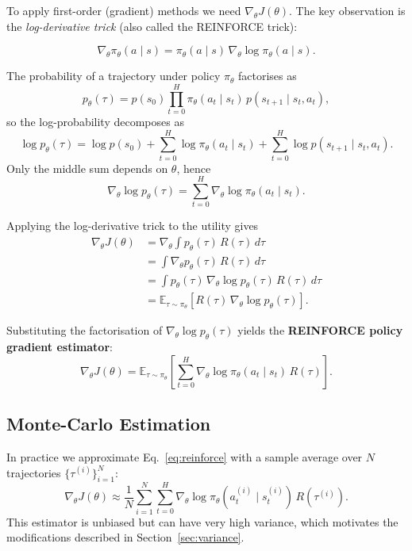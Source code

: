 \documentclass[12pt, a4paper]{article}
\theoremstyle{definition}
\theoremstyle{plain}
\theoremstyle{remark}
\newcommand{\E}{\mathbb{E}}
\newcommand{\traj}{\tau}
\newcommand{\pith}{\pi_\theta}
\newcommand{\Rtraj}{R(\traj)}
\newcommand{\Jth}{J(\theta)}
\newcommand{\grad}{\nabla_\theta}
\begin{document}
To apply first-order (gradient) methods we need $\grad \Jth$.  The key observation is the
\emph{log-derivative trick} (also called the REINFORCE trick):

\begin{equation}
  \grad \pith(a \mid s)
    = \pith(a \mid s)\, \grad \log \pith(a \mid s).
\end{equation}

The probability of a trajectory under policy $\pith$ factorises as
\begin{equation}
  p_\theta(\traj) = p(s_0) \prod_{t=0}^{H} \pith(a_t \mid s_t)\, p(s_{t+1} \mid s_t, a_t),
\end{equation}
so the log-probability decomposes as
\begin{equation}
  \log p_\theta(\traj) = \log p(s_0)
    + \sum_{t=0}^{H} \log \pith(a_t \mid s_t)
    + \sum_{t=0}^{H} \log p(s_{t+1} \mid s_t, a_t).
\end{equation}
Only the middle sum depends on $\theta$, hence
\begin{equation}
  \grad \log p_\theta(\traj) = \sum_{t=0}^{H} \grad \log \pith(a_t \mid s_t).
\end{equation}

Applying the log-derivative trick to the utility gives
\begin{align}
  \grad \Jth
    &= \grad \int p_\theta(\traj)\, \Rtraj\, d\traj \nonumber\\
    &= \int \grad p_\theta(\traj)\, \Rtraj\, d\traj \nonumber\\
    &= \int p_\theta(\traj)\, \grad \log p_\theta(\traj)\, \Rtraj\, d\traj \nonumber\\
    &= \E_{\traj \sim \pith}\!\left[\Rtraj\, \grad \log p_\theta(\traj)\right].
\end{align}

Substituting the factorisation of $\grad \log p_\theta(\traj)$ yields the
\textbf{REINFORCE policy gradient estimator}:
\begin{equation}
  \boxed{
    \grad \Jth
      = \E_{\traj \sim \pith}\!\left[
          \sum_{t=0}^{H} \grad \log \pith(a_t \mid s_t)\, \Rtraj
        \right].
  }
  \label{eq:reinforce}
\end{equation}

\subsection{Monte-Carlo Estimation}

In practice we approximate Eq.~\eqref{eq:reinforce} with a sample average over $N$
trajectories $\{\traj^{(i)}\}_{i=1}^N$:
\begin{equation}
  \grad \Jth \approx
    \frac{1}{N}\sum_{i=1}^{N} \sum_{t=0}^{H}
      \grad \log \pith(a_t^{(i)} \mid s_t^{(i)})\, R(\traj^{(i)}).
\end{equation}
This estimator is unbiased but can have very high variance, which motivates the
modifications described in Section~\ref{sec:variance}.
\end{document}
